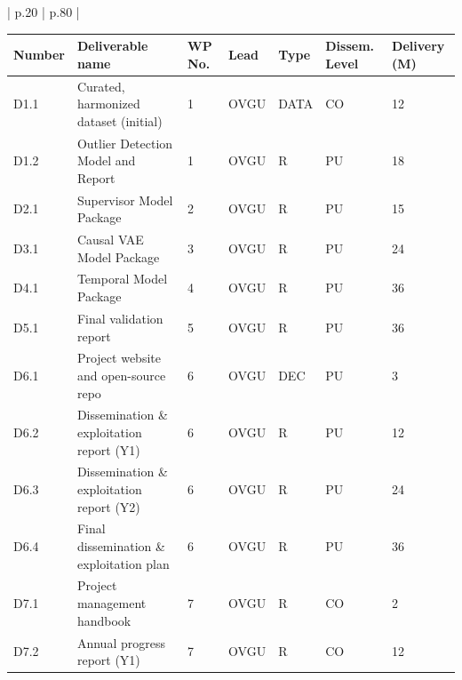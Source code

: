 \documentclass[11pt, a4paper]{article}
\begin{document}
\begin{longtable}{| p{} | p{} |}     \centering
    \caption{List of Deliverables}
    \label{tab:deliverables}
    \small
    \begin{tabular}{l l l l l l l}
        \toprule
        \textbf{Number} & \textbf{Deliverable name} & \textbf{WP No.} & \textbf{Lead} & \textbf{Type} & \textbf{Dissem. Level} & \textbf{Delivery (M)} \\
        \midrule
        D1.1 & Curated, harmonized dataset (initial) & 1 & OVGU & DATA & CO & 12 \\
        D1.2 & Outlier Detection Model and Report & 1 & OVGU & R & PU & 18 \\
        D2.1 & Supervisor Model Package & 2 & OVGU & R & PU & 15 \\
        D3.1 & Causal VAE Model Package & 3 & OVGU & R & PU & 24 \\
        D4.1 & Temporal Model Package & 4 & OVGU & R & PU & 36 \\
        D5.1 & Final validation report & 5 & OVGU & R & PU & 36 \\
        D6.1 & Project website and open-source repo & 6 & OVGU & DEC & PU & 3 \\
        D6.2 & Dissemination \& exploitation report (Y1) & 6 & OVGU & R & PU & 12 \\
        D6.3 & Dissemination \& exploitation report (Y2) & 6 & OVGU & R & PU & 24 \\
        D6.4 & Final dissemination \& exploitation plan & 6 & OVGU & R & PU & 36 \\
        D7.1 & Project management handbook & 7 & OVGU & R & CO & 2 \\
        D7.2 & Annual progress report (Y1) & 7 & OVGU & R & CO & 12 \\

\end{tabular}
\end{longtable}
\end{document}
